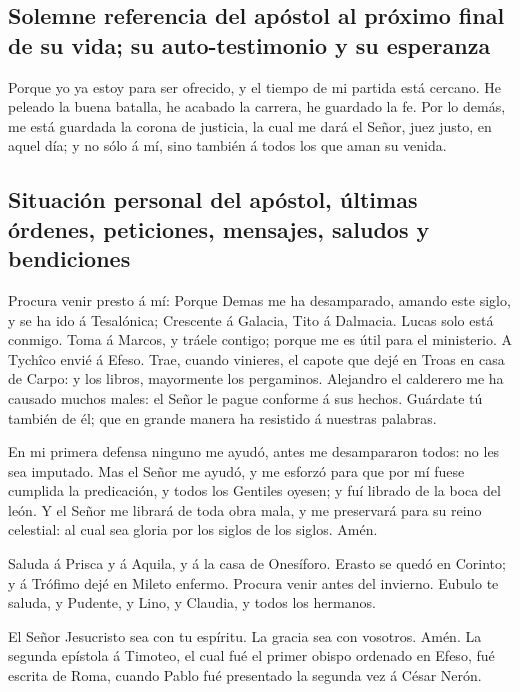 \hypertarget{solemne-referencia-del-apuxf3stol-al-pruxf3ximo-final-de-su-vida-su-auto-testimonio-y-su-esperanza}{%
\subsection{Solemne referencia del apóstol al próximo final de su vida;
su auto-testimonio y su
esperanza}\label{solemne-referencia-del-apuxf3stol-al-pruxf3ximo-final-de-su-vida-su-auto-testimonio-y-su-esperanza}}

 Porque yo ya estoy para ser ofrecido, y el tiempo de mi
partida está cercano.  He peleado la buena batalla, he
acabado la carrera, he guardado la fe.  Por lo demás, me
está guardada la corona de justicia, la cual me dará el Señor, juez
justo, en aquel día; y no sólo á mí, sino también á todos los que aman
su venida.

\hypertarget{situaciuxf3n-personal-del-apuxf3stol-uxfaltimas-uxf3rdenes-peticiones-mensajes-saludos-y-bendiciones}{%
\subsection{Situación personal del apóstol, últimas órdenes, peticiones,
mensajes, saludos y
bendiciones}\label{situaciuxf3n-personal-del-apuxf3stol-uxfaltimas-uxf3rdenes-peticiones-mensajes-saludos-y-bendiciones}}

 Procura venir presto á mí:  Porque Demas
me ha desamparado, amando este siglo, y se ha ido á Tesalónica;
Crescente á Galacia, Tito á Dalmacia.  Lucas solo está
conmigo. Toma á Marcos, y tráele contigo; porque me es útil para el
ministerio.  A Tychîco envié á Efeso. 
Trae, cuando vinieres, el capote que dejé en Troas en casa de Carpo: y
los libros, mayormente los pergaminos.  Alejandro el
calderero me ha causado muchos males: el Señor le pague conforme á sus
hechos.  Guárdate tú también de él; que en grande manera
ha resistido á nuestras palabras.

 En mi primera defensa ninguno me ayudó, antes me
desampararon todos: no les sea imputado.  Mas el Señor me
ayudó, y me esforzó para que por mí fuese cumplida la predicación, y
todos los Gentiles oyesen; y fuí librado de la boca del león.
 Y el Señor me librará de toda obra mala, y me preservará
para su reino celestial: al cual sea gloria por los siglos de los
siglos. Amén.

 Saluda á Prisca y á Aquila, y á la casa de Onesíforo.
 Erasto se quedó en Corinto; y á Trófimo dejé en Mileto
enfermo.  Procura venir antes del invierno. Eubulo te
saluda, y Pudente, y Lino, y Claudia, y todos los hermanos.

 El Señor Jesucristo sea con tu espíritu. La gracia sea
con vosotros. Amén. La segunda epístola á Timoteo, el cual fué el primer
obispo ordenado en Efeso, fué escrita de Roma, cuando Pablo fué
presentado la segunda vez á César Nerón.
